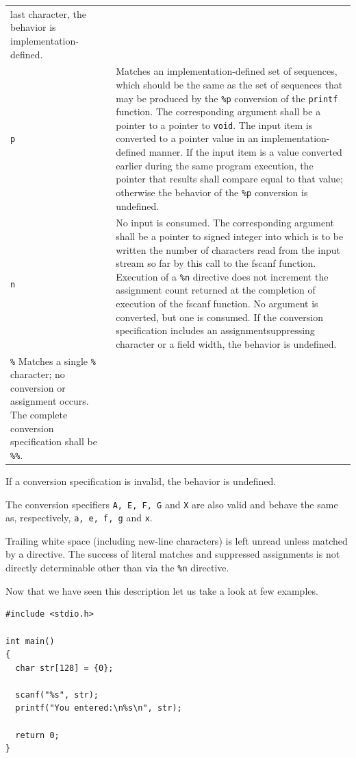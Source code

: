 \begin{longtable}{p{}p{}}
last character, the behavior is implementation-defined.\\
\texttt{p}&Matches an implementation-defined set of sequences, which should be
the same as the set of sequences that may be produced by the \texttt{\%p}
conversion of the \texttt{printf} function. The corresponding argument shall be
a pointer to a pointer to \texttt{void}. The input item is converted to a
pointer value in an implementation-defined manner. If the input item is a value
converted earlier during the same program execution, the pointer that results
shall compare equal to that value; otherwise the behavior of the \texttt{\%p}
conversion is undefined.\\
\texttt{n}&No input is consumed. The corresponding argument shall be a pointer
to signed integer into which is to be written the number of characters read
from the input stream so far by this call to the fscanf function. Execution of
a \texttt{\%n} directive does not increment the assignment count returned at
the completion of execution of the fscanf function. No argument is converted,
but one is consumed. If the conversion specification includes an
assignmentsuppressing character or a field width, the behavior is undefined.\\
\texttt{\%} Matches a single \texttt{\%} character; no conversion or assignment
occurs. The complete conversion specification shall be \texttt{\%\%}.
\end{longtable}

If a conversion specification is invalid, the behavior is undefined.

The conversion specifiers \texttt{A, E, F, G} and \texttt{X} are also valid and
behave the same as, respectively, \texttt{a, e, f, g} and \texttt{x}.

Trailing white space (including new-line characters) is left unread unless
matched by a directive. The success of literal matches and suppressed
assignments is not directly determinable other than via the \texttt{\%n}
directive.

Now that we have seen this description let us take a look at few examples.

\begin{verbatim}
#include <stdio.h>

int main()
{
  char str[128] = {0};

  scanf("%s", str);
  printf("You entered:\n%s\n", str);

  return 0;
}
\end{verbatim}

